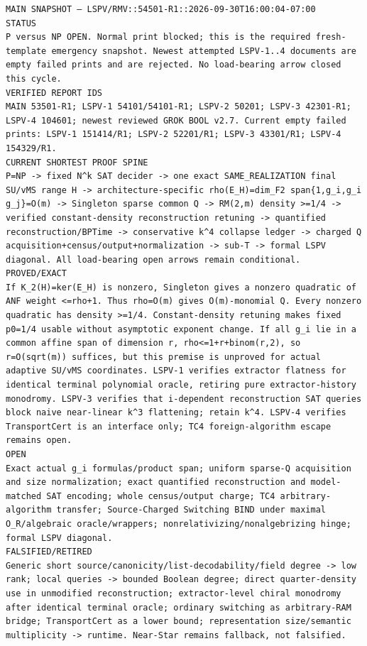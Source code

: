 \documentclass[11pt]{article}
\begin{document}
\bigskip
\begin{Verbatim}[breaklines=true,breakanywhere=true]
MAIN SNAPSHOT — LSPV/RMV::54501-R1::2026-09-30T16:00:04-07:00
STATUS
P versus NP OPEN. Normal print blocked; this is the required fresh-template emergency snapshot. Newest attempted LSPV-1..4 documents are empty failed prints and are rejected. No load-bearing arrow closed this cycle.
VERIFIED REPORT IDS
MAIN 53501-R1; LSPV-1 54101/54101-R1; LSPV-2 50201; LSPV-3 42301-R1; LSPV-4 104601; newest reviewed GROK BOOL v2.7. Current empty failed prints: LSPV-1 151414/R1; LSPV-2 52201/R1; LSPV-3 43301/R1; LSPV-4 154329/R1.
CURRENT SHORTEST PROOF SPINE
P=NP -> fixed N^k SAT decider -> one exact SAME_REALIZATION final SU/vMS range H -> architecture-specific rho(E_H)=dim_F2 span{1,g_i,g_i g_j}=O(m) -> Singleton sparse common Q -> RM(2,m) density >=1/4 -> verified constant-density reconstruction retuning -> quantified reconstruction/BPTime -> conservative k^4 collapse ledger -> charged Q acquisition+census/output+normalization -> sub-T -> formal LSPV diagonal. All load-bearing open arrows remain conditional.
PROVED/EXACT
If K_2(H)=ker(E_H) is nonzero, Singleton gives a nonzero quadratic of ANF weight <=rho+1. Thus rho=O(m) gives O(m)-monomial Q. Every nonzero quadratic has density >=1/4. Constant-density retuning makes fixed p0=1/4 usable without asymptotic exponent change. If all g_i lie in a common affine span of dimension r, rho<=1+r+binom(r,2), so r=O(sqrt(m)) suffices, but this premise is unproved for actual adaptive SU/vMS coordinates. LSPV-1 verifies extractor flatness for identical terminal polynomial oracle, retiring pure extractor-history monodromy. LSPV-3 verifies that i-dependent reconstruction SAT queries block naive near-linear k^3 flattening; retain k^4. LSPV-4 verifies TransportCert is an interface only; TC4 foreign-algorithm escape remains open.
OPEN
Exact actual g_i formulas/product span; uniform sparse-Q acquisition and size normalization; exact quantified reconstruction and model-matched SAT encoding; whole census/output charge; TC4 arbitrary-algorithm transfer; Source-Charged Switching BIND under maximal O_R/algebraic oracle/wrappers; nonrelativizing/nonalgebrizing hinge; formal LSPV diagonal.
FALSIFIED/RETIRED
Generic short source/canonicity/list-decodability/field degree -> low rank; local queries -> bounded Boolean degree; direct quarter-density use in unmodified reconstruction; extractor-level chiral monodromy after identical terminal oracle; ordinary switching as arbitrary-RAM bridge; TransportCert as a lower bound; representation size/semantic multiplicity -> runtime. Near-Star remains fallback, not falsified.

\end{Verbatim}
\end{document}
